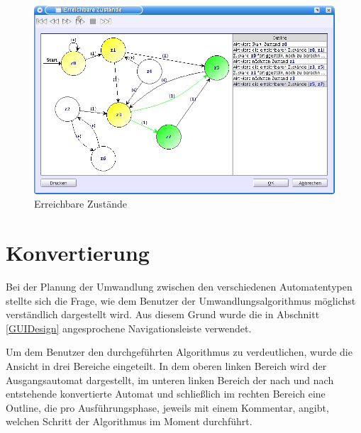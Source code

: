 \begin{figure}[h!]
\begin{center}
\includegraphics[width=12cm]{../images/reachable_states.png}
\caption{Erreichbare Zustände}
\label{FigureReachableStates}
\end{center}
\end{figure}
\vspace{10pt}


\section{Konvertierung}\label{ConverToMachine}

Bei der Planung der Umwandlung zwischen den verschiedenen Automatentypen stellte
sich die Frage, wie dem Benutzer der Umwandlungsalgorithmus möglichst
verständlich dargestellt wird. Aus diesem Grund wurde die in Abschnitt
\ref{GUIDesign} angesprochene Navigationsleiste verwendet.\vspace{10pt}

Um dem Benutzer den durchgeführten Algorithmus zu verdeutlichen, wurde die
Ansicht in drei Bereiche eingeteilt. In dem oberen linken Bereich wird der
Ausgangsautomat dargestellt, im unteren linken Bereich der nach und nach
entstehende konvertierte Automat und schließlich im rechten Bereich eine Outline,
die pro Ausführungsphase, jeweils mit einem Kommentar, angibt, welchen Schritt
der Algorithmus im Moment durchführt.\vspace{10pt}

